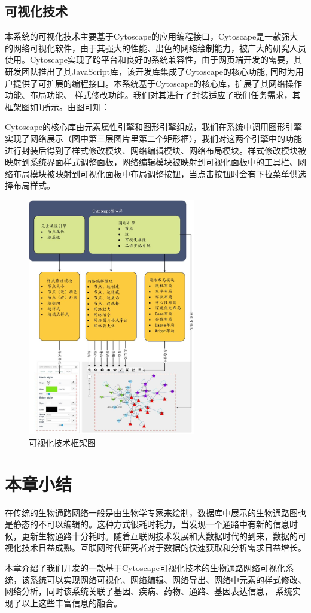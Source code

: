 \subsection{可视化技术}
本系统的可视化技术主要基于Cytoscape的应用编程接口，Cytoscape是一款强大的网络可视化软件，由于其强大的性能、出色的网络绘制能力，被广大的研究人员使用。Cytoscape实现了跨平台和良好的系统兼容性，由于网页端开发的需要，其研发团队推出了其JavaScript库，该开发库集成了Cytoscape的核心功能, 同时为用户提供了可扩展的编程接口。本系统基于Cytoscape的核心库，扩展了其网络操作功能、布局功能、 样式修改功能。我们对其进行了封装适应了我们任务需求，其框架图如\ref{fig33}所示。由图可知：


Cytoscape的核心库由元素属性引擎和图形引擎组成，我们在系统中调用图形引擎实现了网络展示（图中第三层图片里第二个矩形框），我们对这两个引擎中的功能进行封装后得到了样式修改模块、网络编辑模块、网络布局模块。样式修改模块被映射到系统界面样式调整面板，网络编辑模块被映射到可视化面板中的工具栏、网络布局模块被映射到可视化面板中布局调整按钮，当点击按钮时会有下拉菜单供选择布局样式。

\begin{figure}[h]
\centering
\includegraphics[width = 0.65\textwidth]{versioframework}
\caption[fig33]{可视化技术框架图}
\label{fig33}
\end{figure}

\section{本章小结}
在传统的生物通路网络一般是由生物学专家来绘制，数据库中展示的生物通路图也是静态的不可以编辑的。这种方式很耗时耗力，当发现一个通路中有新的信息时候，更新生物通路十分耗时。随着互联网技术发展和大数据时代的到来，数据的可视化技术日益成熟。互联网时代研究者对于数据的快速获取和分析需求日益增长。

本章介绍了我们开发的一款基于Cytoscape可视化技术的生物通路网络可视化系统，该系统可以实现网络可视化、网络编辑、网络导出、网络中元素的样式修改、网络分析，同时该系统关联了基因、疾病、药物、通路、基因表达信息， 系统实现了以上这些丰富信息的融合。
